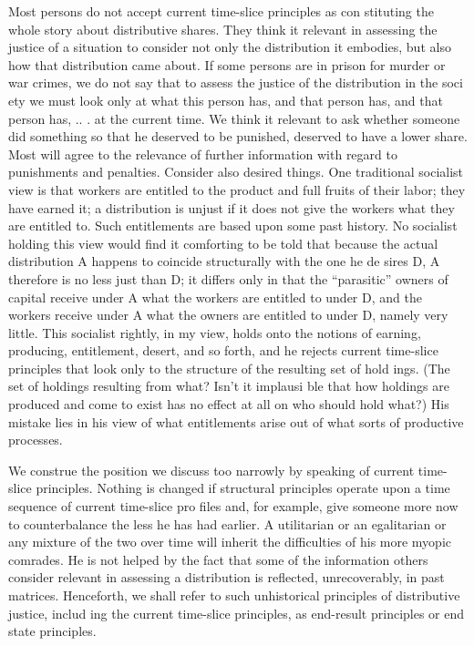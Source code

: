 \documentclass[11pt,openany]{book}
\begin{document}
Most persons do not accept current time-slice principles as con stituting the whole story about distributive shares. They think it relevant in assessing the justice of a situation to consider not only the distribution it embodies, but also how that distribution came about. If some persons are in prison for murder or war crimes, we do not say that to assess the justice of the distribution in the soci ety we must look only at what this person has, and that person has, and that person has, .. . at the current time. We think it relevant to ask whether someone did something so that he deserved to be punished, deserved to have a lower share. Most will agree to the relevance of further information with regard to punishments and penalties. Consider also desired things. One traditional socialist view is that workers are entitled to the product and full fruits of their labor; they have earned it; a distribution is unjust if it does not give the workers what they are entitled to. Such entitlements are based upon some past history. No socialist holding this view would find it comforting to be told that because the actual distribution A happens to coincide structurally with the one he de sires D, A therefore is no less just than D; it differs only in that the ``parasitic'' owners of capital receive under A what the workers are entitled to under D, and the workers receive under A what the owners are entitled to under D, namely very little. This socialist rightly, in my view, holds onto the notions of earning, producing, entitlement, desert, and so forth, and he rejects current time-slice principles that look only to the structure of the resulting set of hold ings. (The set of holdings resulting from what? Isn't it implausi ble that how holdings are produced and come to exist has no effect at all on who should hold what?) His mistake lies in his view of what entitlements arise out of what sorts of productive processes. 

We construe the position we discuss too narrowly by speaking of current time-slice principles. Nothing is changed if structural principles operate upon a time sequence of current time-slice pro files and, for example, give someone more now to counterbalance the less he has had earlier. A utilitarian or an egalitarian or any mixture of the two over time will inherit the difficulties of his more myopic comrades. He is not helped by the fact that some of the information others consider relevant in assessing a distribution is reflected, unrecoverably, in past matrices. Henceforth, we shall refer to such unhistorical principles of distributive justice, includ ing the current time-slice principles, as end-result principles or end state principles. 
\end{document}
